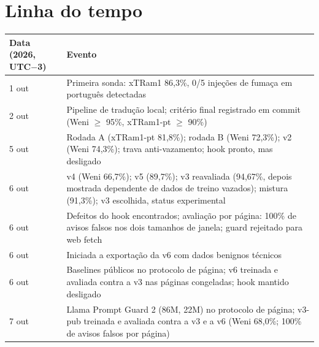 \documentclass[11pt]{article}
\begin{document}
\section{Linha do tempo}\label{app:C}

\begin{center}
\small
\begin{tabularx}{\linewidth}{@{}l>{\raggedright\arraybackslash\hsize=1.00\hsize}X@{}}
\toprule
Data (2026, UTC\ensuremath{-}3) & Evento \\
\midrule
1 out & Primeira sonda: xTRam1 86,3\%, 0/5 injeções de fumaça em português detectadas %
 \\
2 out & Pipeline de tradução local; critério final registrado em commit (Weni \ensuremath{\geq} 95\%, xTRam1-pt \ensuremath{\geq} 90\%) %
 \\
5 out & Rodada A (xTRam1-pt 81,8\%); rodada B (Weni 72,3\%); v2 (Weni 74,3\%); trava anti-vazamento; hook pronto, mas desligado %
 \\
6 out & v4 (Weni 66,7\%); v5 (89,7\%); v3 reavaliada (94,67\%, depois mostrada dependente de dados de treino vazados); mistura (91,3\%); v3 escolhida, status experimental %
 \\
6 out & Defeitos do hook encontrados; avaliação por página: 100\% de avisos falsos nos dois tamanhos de janela; guard rejeitado para web fetch %
 \\
6 out & Iniciada a exportação da v6 com dados benignos técnicos %
 \\
6 out & Baselines públicos no protocolo de página; v6 treinada e avaliada contra a v3 nas páginas congeladas; hook mantido desligado %
 \\
7 out & Llama Prompt Guard 2 (86M, 22M) no protocolo de página; v3-pub treinada e avaliada contra a v3 e a v6 (Weni 68,0\%; 100\% de avisos falsos por página) %
 \\
\bottomrule
\end{tabularx}
\end{center}
\end{document}

